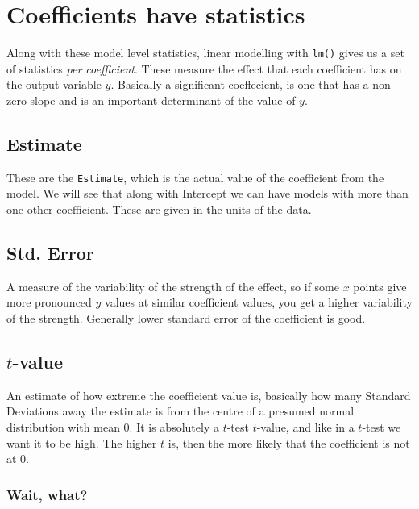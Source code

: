 \documentclass[
]{book}
\begin{document}
\hypertarget{coefficients-have-statistics}{%
\section{Coefficients have statistics}\label{coefficients-have-statistics}}

Along with these model level statistics, linear modelling with \texttt{lm()} gives us a set of statistics \emph{per coefficient}. These measure the effect that each coefficient has on the output variable \(y\). Basically a significant coeffecient, is one that has a non-zero slope and is an important determinant of the value of \(y\).

\hypertarget{estimate}{%
\subsection{Estimate}\label{estimate}}

These are the \texttt{Estimate}, which is the actual value of the coefficient from the model. We will see that along with Intercept we can have models with more than one other coefficient. These are given in the units of the data.

\hypertarget{std.-error}{%
\subsection{Std. Error}\label{std.-error}}

A measure of the variability of the strength of the effect, so if some \(x\) points give more pronounced \(y\) values at similar coefficient values, you get a higher variability of the strength. Generally lower standard error of the coefficient is good.

\hypertarget{t-value}{%
\subsection{\texorpdfstring{\(t\)-value}{t-value}}\label{t-value}}

An estimate of how extreme the coefficient value is, basically how many Standard Deviations away the estimate is from the centre of a presumed normal distribution with mean 0. It is absolutely a \(t\)-test \(t\)-value, and like in a \(t\)-test we want it to be high. The higher \(t\) is, then the more likely that the coefficient is not at 0.

\hypertarget{wait-what}{%
\subsubsection{Wait, what?}\label{wait-what}}
\end{document}
